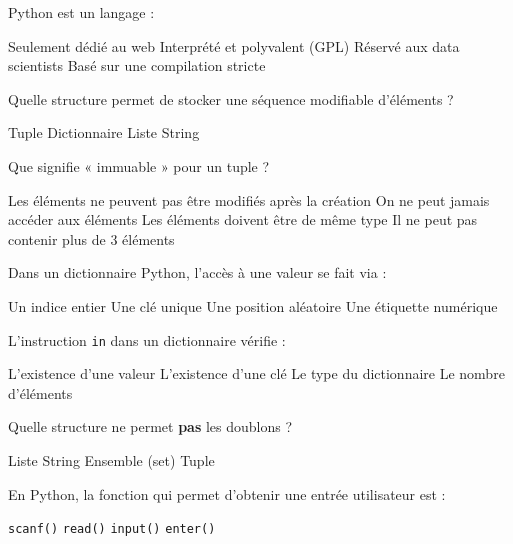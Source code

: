 \documentclass[11pt,a4paper]{exam}
\begin{document}
\begin{questions}

\question[1] Python est un langage :
\begin{checkboxes}
  \choice Seulement dédié au web
  \choice Interprété et polyvalent (GPL)
  \choice Réservé aux data scientists
  \choice Basé sur une compilation stricte
\end{checkboxes}

\question[1] Quelle structure permet de stocker une séquence modifiable d'éléments ?
\begin{checkboxes}
  \choice Tuple
  \choice Dictionnaire
  \choice Liste
  \choice String
\end{checkboxes}

\question[1] Que signifie « immuable » pour un tuple ?
\begin{checkboxes}
  \choice Les éléments ne peuvent pas être modifiés après la création
  \choice On ne peut jamais accéder aux éléments
  \choice Les éléments doivent être de même type
  \choice Il ne peut pas contenir plus de 3 éléments
\end{checkboxes}

\question[1] Dans un dictionnaire Python, l’accès à une valeur se fait via :
\begin{checkboxes}
  \choice Un indice entier
  \choice Une clé unique
  \choice Une position aléatoire
  \choice Une étiquette numérique
\end{checkboxes}

\question[1] L’instruction \texttt{in} dans un dictionnaire vérifie :
\begin{checkboxes}
  \choice L’existence d’une valeur
  \choice L’existence d’une clé
  \choice Le type du dictionnaire
  \choice Le nombre d’éléments
\end{checkboxes}

\question[1] Quelle structure ne permet \textbf{pas} les doublons ?
\begin{checkboxes}
  \choice Liste
  \choice String
  \choice Ensemble (set)
  \choice Tuple
\end{checkboxes}

\question[1] En Python, la fonction qui permet d’obtenir une entrée utilisateur est :
\begin{checkboxes}
  \choice \texttt{scanf()}
  \choice \texttt{read()}
  \choice \texttt{input()}
  \choice \texttt{enter()}
\end{checkboxes}

\newpage


\end{questions}
\end{document}
